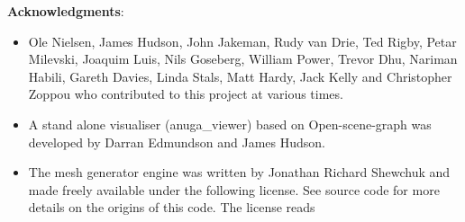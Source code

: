 \pagebreak
\textbf{Acknowledgments}:
\begin{itemize}
\item Ole Nielsen, James Hudson, John Jakeman, Rudy van Drie, Ted Rigby, 
      Petar Milevski, Joaquim Luis, Nils Goseberg, William Power,
      Trevor Dhu, Nariman Habili, Gareth Davies, Linda Stals, Matt Hardy, Jack Kelly and Christopher
      Zoppou who contributed to this project at various times.
\item A stand alone visualiser (anuga\_viewer) based on Open-scene-graph was developed by Darran Edmundson and James Hudson.
\item The mesh generator engine was written by Jonathan Richard Shewchuk and made freely
      available under the following license.  See source code  for more
      details on the origins of this code. The license reads


\end{itemize}
